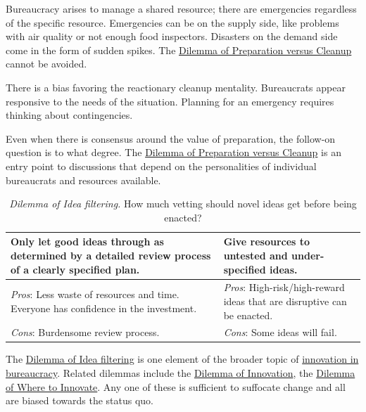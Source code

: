 Bureaucracy arises to manage a shared resource; there are emergencies regardless of the specific resource. Emergencies can be on the supply side, like problems with air quality or not enough food inspectors. Disasters on the demand side come in the form of sudden spikes. The  \href{table:emergencies-vs-ignore}{Dilemma of Preparation versus Cleanup} cannot be avoided. 

There is a bias favoring the reactionary cleanup mentality. Bureaucrats appear responsive to the needs of the situation. Planning for an emergency requires thinking about contingencies. 

Even when there is consensus around the value of preparation, the follow-on question is to what degree. 
The \href{table:emergencies-vs-ignore}{Dilemma of Preparation versus Cleanup} is an entry point to discussions that depend on the personalities of individual bureaucrats and resources available. 


\begin{center}
\begin{table}[H] %
\begin{tabular}{ | m{\dilemmatablewidth}| m{\dilemmatablewidth} | } 
  \hline
  \textbf{Only let good ideas through as determined by a detailed review process of a clearly specified plan.} &
  \textbf{Give resources to untested and under-specified ideas.} \\
  \hline
  \textit{Pros}: Less waste of resources and time. Everyone has confidence in the investment. & 
  \textit{Pros}: High-risk/high-reward ideas that are disruptive can be enacted. \\
  \hline
  \textit{Cons}: Burdensome review process. & 
  \textit{Cons}: Some ideas will fail. \\
  \hline
\end{tabular}
\caption{
\textit{Dilemma of Idea filtering.}
How much vetting should novel ideas get before being enacted?
}
\label{table:idea-filtering}
\end{table}
\end{center}

The \href{table:idea-filtering}{Dilemma of Idea filtering} is one element of the broader topic of \hyperref[sec:innovation]{innovation in bureaucracy}. Related dilemmas include the \href{table:disruptive-or-iterative}{Dilemma of Innovation}, the \href{table:where-to-innovate}{Dilemma of Where to Innovate}. Any one of these is sufficient to suffocate change and all are biased towards the status quo.  

